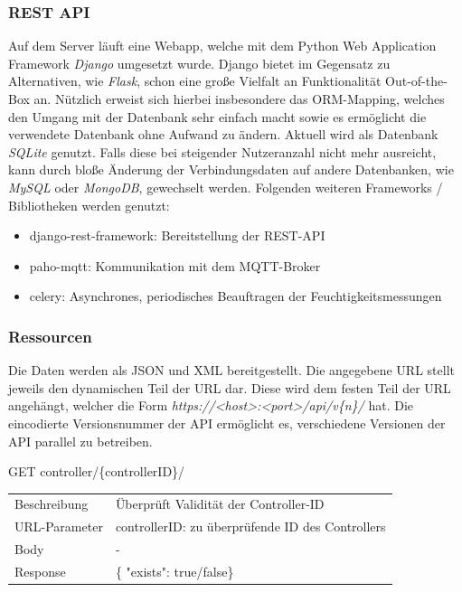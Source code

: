         \subsubsection{REST API}
        Auf dem Server läuft eine Webapp, welche mit dem Python Web Application Framework \textit{Django} umgesetzt wurde. Django bietet im Gegensatz zu Alternativen, wie \textit{Flask}, schon eine große Vielfalt an Funktionalität Out-of-the-Box an. Nützlich erweist sich hierbei insbesondere das ORM-Mapping, welches den Umgang mit der Datenbank sehr einfach macht sowie es ermöglicht die verwendete Datenbank ohne Aufwand zu ändern. Aktuell wird als Datenbank \textit{SQLite} genutzt. Falls diese bei steigender Nutzeranzahl nicht mehr ausreicht, kann durch bloße Änderung der Verbindungsdaten auf andere Datenbanken, wie \textit{MySQL} oder \textit{MongoDB}, gewechselt werden.
        Folgenden weiteren Frameworks / Bibliotheken werden genutzt:
        \begin{itemize}
            \item django-rest-framework: Bereitstellung der REST-API
            \item paho-mqtt: Kommunikation mit dem MQTT-Broker
            \item celery: Asynchrones, periodisches Beauftragen der Feuchtigkeitsmessungen
        \end{itemize}
    
        \subsubsection{Ressourcen}
        Die Daten werden als JSON und XML bereitgestellt. Die angegebene URL stellt jeweils den dynamischen Teil der URL dar. Diese wird dem festen Teil der URL angehängt, welcher die Form \textit{https://<host>:<port>/api/v\{n\}/} hat. Die eincodierte Versionsnummer der API ermöglicht es, verschiedene Versionen der API parallel zu betreiben.\\
        
        \newcommand{\tabitem}{~~\llap{\textbullet}~~}
     \begin{minipage}{\textwidth}
             GET controller/\{controllerID\}/ 
        
          \begin{tabularx}{\textwidth}{lX}
                \toprule Beschreibung & Überprüft Validität der Controller-ID \\
                URL-Parameter & controllerID: zu überprüfende ID des Controllers \\
                Body & - \\
                Response & \{ "exists": true/false\}
            \end{tabularx}
    \end{minipage}\\\\
        
